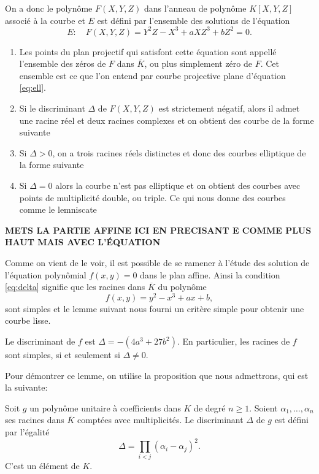 
On a donc le polynôme $F(X,Y,Z)$ dans l'anneau de polynôme $K[X,Y,Z]$ associé à la courbe et
$E$ est défini par l'ensemble des solutions de l'équation 
\[
E:\quad F(X,Y,Z) = Y^2Z-X^3+aXZ^3+bZ^2 = 0
.\] 

\begin{remarque}
    \begin{enumerate}
        \item 
Les points du plan projectif qui satisfont cette équation sont appellé l'ensemble des zéros
de $F$ dans $\overline{K}$, ou plus simplement zéro de $F$. Cet ensemble est ce que l'on
entend par courbe projective plane d'équation \eqref{eq:ell}. 
        \item Si le discriminant $\Delta$ de $F(X,Y,Z)$ est strictement négatif, alors il
            admet une racine réel et deux racines complexes et on obtient des courbe de la
            forme suivante
        \item Si $\Delta > 0$, on a trois racines réels distinctes et donc des courbes
            elliptique de la forme suivante
        \item Si $\Delta = 0$ alors la courbe n'est pas elliptique et on obtient des
            courbes avec points de multiplicité double, ou triple. Ce qui nous donne des
            courbes comme le lemniscate
    \end{enumerate}
\end{remarque}
\textbf{METS LA PARTIE AFFINE ICI EN PRECISANT E COMME PLUS HAUT MAIS AVEC L'ÉQUATION}

Comme on vient de le voir, il est possible de se ramener à l'étude
des solution de l'équation
polynômial $f(x,y) = 0$ dans le plan affine. Ainsi la condition \eqref{eq:delta}
signifie que les racines dans $\overline{K}$ du polynôme
\[
f(x,y) = y^2 - x^3 + ax + b
,\] 
sont simples et le lemme suivant nous fourni un critère simple pour obtenir une courbe
lisse.

\begin{lemme}
    \label{lem:lemme1}
    Le discriminant de $f$ est $\Delta = -(4a^3 + 27b^2)$. En particulier, les racines de $f$ sont simples, si et seulement si $\Delta \neq 0$.
\end{lemme}

Pour démontrer ce lemme, on utilise la proposition que nous admettrons, qui est la suivante:
\begin{proposition}
    \label{prop:discriminant}
    Soit $g$ un polynôme unitaire à coefficients dans $K$ de degré $n \ge 1$. Soient
    $\alpha_1,\ldots,\alpha_{n}$ ses racines dans $\overline{K}$ comptées avec
    multiplicités. Le discriminant $\Delta$ de $g$ est défini par l'égalité
    \[
    \Delta = \prod_{i<j}^{} \left( \alpha_{i} - \alpha_{j} \right) ^2 
    .\] 
    C'est un élément de $K$.
\end{proposition}

